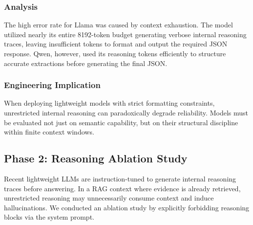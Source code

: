 \documentclass[conference]{IEEEtran}
\begin{document}
\subsubsection*{Analysis}
The high error rate for Llama was caused by context exhaustion. The model utilized nearly its entire 8192-token budget generating verbose internal reasoning traces, leaving insufficient tokens to format and output the required JSON response. Qwen, however, used its reasoning tokens efficiently to structure accurate extractions before generating the final JSON.

\subsubsection*{Engineering Implication}
When deploying lightweight models with strict formatting constraints, unrestricted internal reasoning can paradoxically degrade reliability. Models must be evaluated not just on semantic capability, but on their structural discipline within finite context windows.

\subsection{Phase 2: Reasoning Ablation Study}
\label{sec:phase2}

Recent lightweight LLMs are instruction-tuned to generate internal reasoning traces before answering. In a RAG context where evidence is already retrieved, unrestricted reasoning may unnecessarily consume context and induce hallucinations. We conducted an ablation study by explicitly forbidding reasoning blocks via the system prompt.

\begin{table}[!t]
\centering
\caption{Phase 2: Reasoning Ablation (Restricted Reasoning)}
\label{tab:phase2}
\renewcommand{\arraystretch}{1.2}
\end{table}
\end{document}

